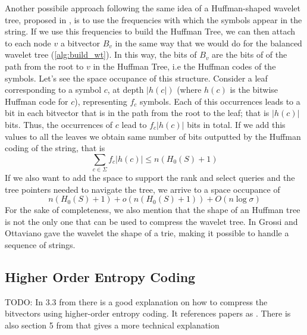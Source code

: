 \noindent Another possibile approach following the same idea of a Huffman-shaped wavelet tree, proposed in \cite{makinen2004new}, is to use the frequencies with which the symbols appear in the string. If we use this frequencies to build the Huffman Tree, we can then attach to each node $v$ a bitvector $B_v$ in the same way that we would do for the balanced wavelet tree (\ref{alg:build_wt}). In this way, the bits of $B_v$ are the bits of of the path from the root to $v$ in the Huffman Tree, i.e the Huffman codes of the symbols. Let's see the space occupance of this structure. Consider a leaf corresponding to a symbol $c$, at depth $|h(c|)$ (where $h(c)$ is the bitwise Huffman code for $c$), representing $f_c$ symbols. Each of this occurrences leads to a bit in each bitvector that is in the path from the root to the leaf; that is $|h(c)|$ bits. Thus, the occurrences of $c$ lead to $f_c |h(c)|$ bits in total. If we add this values to all the leaves we obtain same number of bits outputted by the Huffman coding of the string, that is
\begin{equation}
    \sum_{c \in \Sigma} f_c |h(c)| \leq n(H_0(S) + 1)
\end{equation}
If we also want to add the space to support the rank and select queries and the tree pointers needed to navigate the tree, we arrive to a space occupance of
\begin{equation}
    n(H_0(S) + 1) + o(n(H_0(S) + 1)) + O(n \log \sigma)
\end{equation}
For the sake of completeness, we also mention that the shape of an Huffman tree is not the only one that can be used to compress the wavelet tree. In \cite{grossi2012wavelet} Grossi and Ottaviano gave the wavelet the shape of a trie, making it possible to handle a sequence of strings.

\subsection{Higher Order Entropy Coding}
TODO: In 3.3 from \cite{WTForALL} there is a good explanation on how to compress the bitvectors using higher-order entropy coding. It references papers as \cite{grossi2004indexing}. There is also section 5 from \cite{TheMyriadVirtuesWT} that gives a more technical explanation
